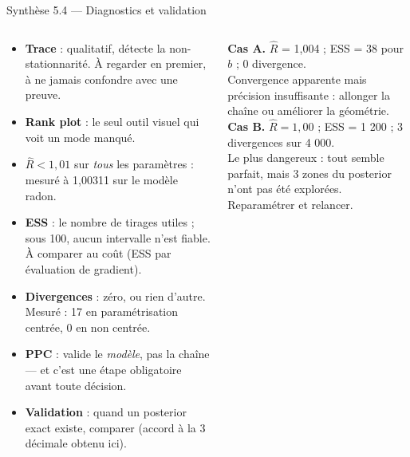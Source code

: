 \begin{frame}{Synthèse 5.4 --- Diagnostics et validation}
\begin{columns}[t]
\begin{column}{0.49\textwidth}
\begin{tcolorbox}[enhanced,colback=byPurple!7,colframe=byPurple,arc=2mm,
   title={\bfseries\color{white}\faLightbulb\ Synthèse},colbacktitle=byPurple,
   attach boxed title to top left={xshift=3mm,yshift=-2mm},
   boxed title style={arc=1mm,boxrule=0pt}]
\begin{itemize}
  \item \textbf{Trace} : qualitatif, détecte la non-stationnarité. À regarder en
        premier, à ne jamais confondre avec une preuve.
  \item \textbf{Rank plot} : le seul outil visuel qui voit un mode manqué.
  \item \textbf{$\hat R < 1{,}01$} sur \emph{tous} les paramètres : mesuré à
        1,00311 sur le modèle radon.
  \item \textbf{ESS} : le nombre de tirages utiles ; sous 100, aucun intervalle
        n'est fiable. À comparer au coût (ESS par évaluation de gradient).
  \item \textbf{Divergences} : zéro, ou rien d'autre. Mesuré : 17 en paramétrisation
        centrée, 0 en non centrée.
  \item \textbf{PPC} : valide le \emph{modèle}, pas la chaîne --- et c'est une
        étape obligatoire avant toute décision.
  \item \textbf{Validation} : quand un posterior exact existe, comparer (accord
        à la 3\ieme{} décimale obtenu ici).
\end{itemize}
\end{tcolorbox}
\end{column}
\begin{column}{0.49\textwidth}
\begin{qbox}
\textbf{Cas A.} $\hat R$ = 1,004 ; ESS = 38 pour $b$ ; 0 divergence.
\\ \footnotesize Convergence apparente mais précision insuffisante : allonger la
chaîne ou améliorer la géométrie.\\[1.5mm]
\textbf{Cas B.} $\hat R = 1{,}00$ ; ESS = 1 200 ; 3 divergences sur 4 000.
\\ \footnotesize Le plus dangereux : tout semble parfait, mais 3 zones du
posterior n'ont pas été explorées. Reparamétrer et relancer.\\[1.5mm]

\end{qbox}
\end{column}
\end{columns}
\end{frame}

